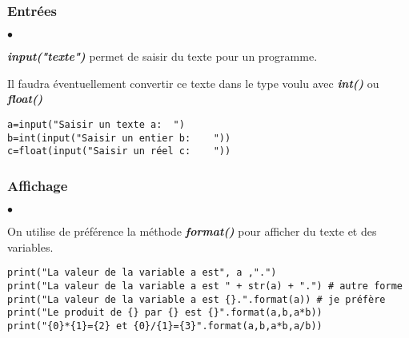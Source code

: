 \documentclass[10pt,dvipsnames,  dvips]{article}
\begin{document}
\subsubsection*{Entrées}


\begin{minipage}[t]{9cm}
\begin{list}{$\bullet$}{}
\item \textbf{\textit{input("texte")}} permet de saisir du texte pour un programme.
\item Il faudra éventuellement convertir ce texte dans le type voulu avec \textbf{\textit{int()}} ou \textbf{\textit{float()}}
\end{list}
\end{minipage}
\hspace{0.5cm}
\begin{minipage}[t]{8cm}
\lstset{ style=PYTHON}
\begin{lstlisting}
a=input("Saisir un texte a:  ")
b=int(input("Saisir un entier b:    "))
c=float(input("Saisir un réel c:    "))
\end{lstlisting}
\end{minipage}


\subsubsection*{Affichage}

\begin{list}{$\bullet$}{}
\item On utilise de préférence la méthode \textbf{\textit{format()}} pour afficher du texte et des variables.
\end{list}

\begin{lstlisting}
print("La valeur de la variable a est", a ,".")
print("La valeur de la variable a est " + str(a) + ".") # autre forme
print("La valeur de la variable a est {}.".format(a)) # je préfère
print("Le produit de {} par {} est {}".format(a,b,a*b))
print("{0}*{1}={2} et {0}/{1}={3}".format(a,b,a*b,a/b))
\end{lstlisting}
\end{document}

